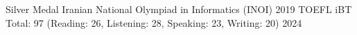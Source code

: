 


\begin{cvhonors}

  \cvhonor
    {Silver Medal} %
    {Iranian National Olympiad in Informatics (INOI)} %
    {} %
    {2019} %
  \cvhonor
    {TOEFL iBT} %
    {Total: 97 (Reading: 26, Listening: 28, Speaking: 23, Writing: 20)} %
    {} %
    {2024} %
\end{cvhonors}
